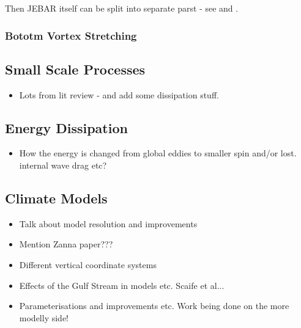 \documentclass[..\EOYR.tex]{subfiles}
\begin{document}
Then JEBAR itself can be split into separate parst - see \citep{Greatbatch1991} and \citep{Gula2014}.\\


\subsubsection*{Bototm Vortex Stretching}

\subsection{Small Scale Processes}
\begin{itemize}
    \item Lots from lit review - and add some dissipation stuff.
\end{itemize}

\subsection{Energy Dissipation}
\begin{itemize}
    \item How the energy is changed from global eddies to smaller spin and/or lost. internal wave drag etc?
\end{itemize}

\subsection{Climate Models}
\begin{itemize}
    \item Talk about model resolution and improvements
    \item Mention Zanna paper???
    \item Different vertical coordinate systems
    \item Effects of the Gulf Stream in models etc. Scaife et al...
    \item Parameterisations and improvements etc. Work being done on the more modelly side!
\end{itemize}
\end{document}

